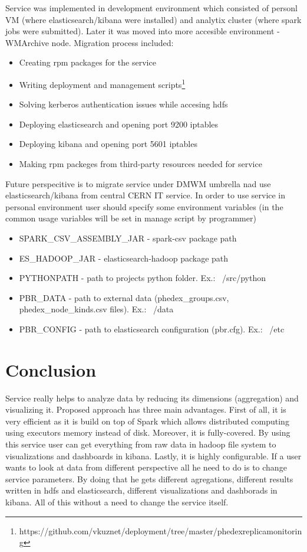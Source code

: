 Service was implemented in development environment which consisted of personl VM (where elasticsearch/kibana were installed) and analytix cluster (where spark jobs were 
submitted). Later it was moved into more accesible environment - WMArchive node. Migration process included:
\begin{itemize}
\item Creating rpm packages for the service
\item Writing deployment and management scripts\footnote{https://github.com/vkuznet/deployment/tree/master/phedexreplicamonitoring}
\item Solving kerberos authentication issues while accesing hdfs
\item Deploying elasticsearch and opening port 9200 iptables
\item Deploying kibana and opening port 5601 iptables
\item Making rpm packeges from third-party resources needed for service
\end{itemize}
Future perspecitive is to migrate service under DMWM umbrella nad use elasticsearch/kibana from central CERN IT service.
In order to use service in personal environment user should specify some environment variables (in the common usage variables will be set in manage script by programmer)
\begin{itemize}
\item SPARK{\_}CSV{\_}ASSEMBLY{\_}JAR - spark-csv package path
\item ES{\_}HADOOP{\_}JAR - elasticsearch-hadoop package path
\item PYTHONPATH - path to projects python folder. Ex.: ~/src/python
\item PBR{\_}DATA - path to external data (phedex{\_}groups.csv, phedex{\_}node{\_}kinds.csv files). Ex.: ~/data
\item PBR{\_}CONFIG - path to elasticsearch configuration (pbr.cfg). Ex.: ~/etc
\end{itemize}

\section{Conclusion}

Service really helps to analyze data by reducing its dimensions (aggregation) and visualizing it. Proposed approach has three main advantages. First of all, it is very 
efficient as it is build on top of Spark which allows distributed computing using executors memory instead of disk. Moreover, it is fully-covered. By using this service 
user can get everything from raw data in hadoop file system to visualizations and dashboards in kibana. Lastly, it is highly configurable. If a user wants to look at data 
from different perspective all he need to do is to change service parameters. By doing that he gets different agregations, different results written in hdfs and elasticsearch, 
different visualizations and dashborads in kibana. All of this without a need to change the service itself.


